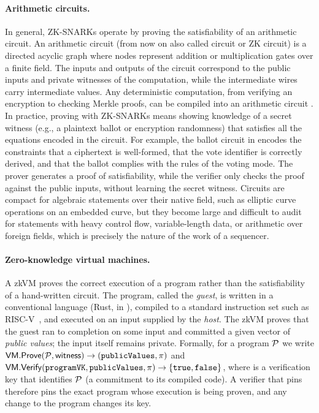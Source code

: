 \paragraph{Arithmetic circuits.} In general, \acsp{ZK-SNARK} operate by proving the satisfiability of an arithmetic circuit.
An arithmetic circuit (from now on also called circuit or \ac{ZK} circuit) is a directed acyclic graph where nodes represent addition or multiplication gates over a finite field. The inputs and outputs of the circuit correspond to the public inputs and private witnesses of the computation, while the intermediate wires carry intermediate values. Any deterministic computation, from verifying an encryption to checking Merkle proofs, can be compiled into an arithmetic circuit \cite{gennaro2013quadratic}.
In practice, proving with \acsp{ZK-SNARK} means showing knowledge of a secret witness (e.g., a plaintext ballot or encryption randomness) that satisfies all the equations encoded in the circuit. For example, the ballot circuit in \davinci encodes the constraints that a ciphertext is well-formed, that the vote identifier is correctly derived, and that the ballot complies with the rules of the voting mode. The prover generates a proof of satisfiability, while the verifier only checks the proof against the public inputs, without learning the secret witness. Circuits are compact for algebraic statements over their native field, such as elliptic curve operations on an embedded curve, but they become large and difficult to audit for statements with heavy control flow, variable-length data, or arithmetic over foreign fields, which is precisely the nature of the work of a sequencer.

\paragraph{Zero-knowledge virtual machines.}
A \ac{zkVM} proves the correct execution of a program rather than the satisfiability of a hand-written circuit. The program, called the \emph{guest}, is written in a conventional language (Rust, in \davinci), compiled to a standard instruction set such as RISC-V~\cite{riscv2019}, and executed on an input supplied by the \emph{host}. The \ac{zkVM} proves that the guest ran to completion on some input and committed a given vector of \emph{public values}; the input itself remains private. Formally, for a program $\mathcal{P}$ we write ${\sf{VM.Prove}}(\mathcal{P}, {\sf{witness}}) \rightarrow (\texttt{publicValues}, \pi)$ and ${\sf{VM.Verify}}(\texttt{programVK}, \texttt{publicValues}, \pi) \rightarrow \{\texttt{true}, \texttt{false}\}$, where \programvk is a verification key that identifies $\mathcal{P}$ (a commitment to its compiled code). A verifier that pins \programvk therefore pins the exact program whose execution is being proven, and any change to the program changes its key.

